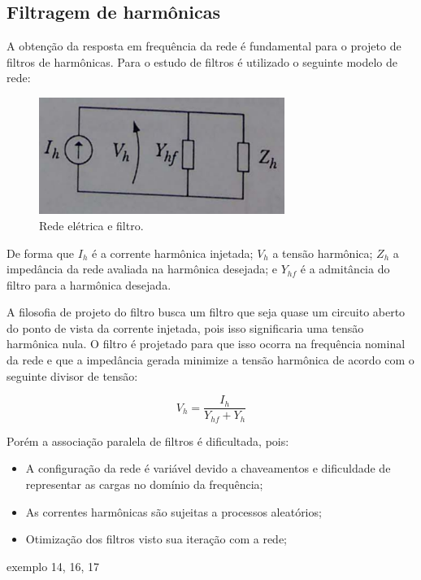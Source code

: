 \subsection{Filtragem de harmônicas}

A obtenção da resposta em frequência da rede é fundamental para o projeto de filtros de harmônicas. Para o estudo de filtros é utilizado o seguinte modelo de rede:

\begin{figure}[H]
\begin{center}
\includegraphics[width=8cm]{images/harmonicas.png}
\caption{Rede elétrica e filtro.}
\label{slide3:filt} 
\end{center}
\end{figure}

De forma que $I_h$ é a corrente harmônica injetada; $V_h$ a tensão harmônica; $Z_h$ a impedância da rede avaliada na harmônica desejada; e $Y_{hf}$ é a admitância do filtro para a harmônica desejada.

A filosofia de projeto do filtro busca um filtro que seja quase um circuito aberto do ponto de vista da corrente injetada, pois isso significaria uma tensão harmônica nula. O filtro é projetado para que isso ocorra na frequência nominal da rede e que a impedância gerada minimize a tensão harmônica de acordo com o seguinte divisor de tensão:

\begin{equation} \label{slide4:filter}
    V_h = \frac{I_h}{Y_{hf} + Y_h}
\end{equation}

Porém a associação paralela de filtros é dificultada, pois:

\begin{itemize}
    \item A configuração da rede é variável devido a  chaveamentos e dificuldade de representar as cargas no domínio da frequência;
    \item As correntes harmônicas são sujeitas a processos aleatórios;
    \item Otimização dos filtros visto sua iteração com a rede;
\end{itemize}






exemplo 14, 16, 17